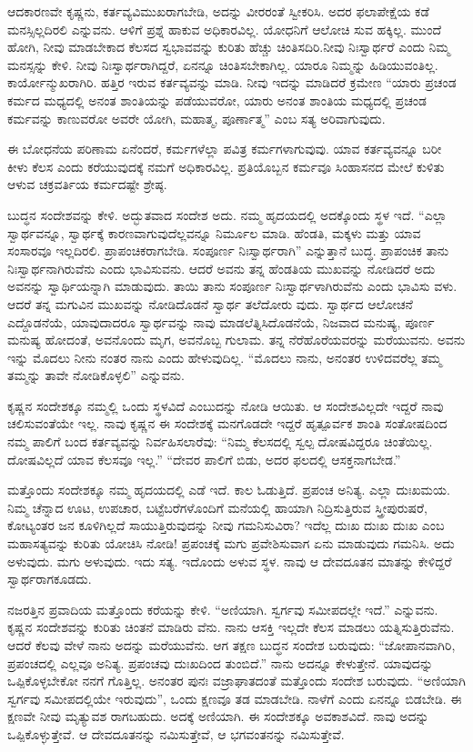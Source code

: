 ಆದಕಾರಣವೇ ಕೃಷ್ಣನು, ಕರ್ತವ್ಯವಿಮುಖರಾಗಬೇಡಿ, ಅದನ್ನು ವೀರರಂತೆ ಸ್ವೀಕರಿಸಿ. ಅದರ ಫಲಾಪೇಕ್ಷೆಯ ಕಡೆ ಮನಸ್ಸಿಲ್ಲದಿರಲಿ ಎನ್ನುವನು. ಆಳಿಗೆ ಪ್ರಶ್ನೆ ಹಾಕುವ ಅಧಿಕಾರವಿಲ್ಲ. ಯೋಧನಿಗೆ ಆಲೋಚಿ ಸುವ ಹಕ್ಕಿಲ್ಲ. ಮುಂದೆ ಹೋಗಿ, ನೀವು ಮಾಡಬೇಕಾದ ಕೆಲಸದ ಸ್ವಭಾವವನ್ನು ಕುರಿತು ಹೆಚ್ಚು ಚಿಂತಿಸದಿರಿ.ನೀವು ನಿಃಸ್ವಾರ್ಥರೆ ಎಂದು ನಿಮ್ಮ ಮನಸ್ಸನ್ನು ಕೇಳಿ. ನೀವು ನಿಃಸ್ವಾರ್ಥರಾಗಿದ್ದರೆ, ಏನನ್ನೂ ಚಿಂತಿಸಬೇಕಾಗಿಲ್ಲ. ಯಾರೂ ನಿಮ್ಮನ್ನು ಹಿಡಿಯುವಂತಿಲ್ಲ. ಕಾರ್ಯೋನ್ಮುಖರಾಗಿರಿ. ಹತ್ತಿರ ಇರುವ ಕರ್ತವ್ಯವನ್ನು ಮಾಡಿ. ನೀವು ಇದನ್ನು ಮಾಡಿದರೆ ಕ್ರಮೇಣ “ಯಾರು ಪ್ರಚಂಡ ಕರ್ಮದ ಮಧ್ಯದಲ್ಲಿ ಅನಂತ ಶಾಂತಿಯನ್ನು ಪಡೆಯುವರೋ, ಯಾರು ಅನಂತ ಶಾಂತಿಯ ಮಧ್ಯದಲ್ಲಿ ಪ್ರಚಂಡ ಕರ್ಮವನ್ನು ಕಾಣುವರೋ ಅವರೇ ಯೋಗಿ, ಮಹಾತ್ಮ, ಪೂರ್ಣಾತ್ಮ” ಎಂಬ ಸತ್ಯ ಅರಿವಾಗುವುದು.

ಈ ಬೋಧನೆಯ ಪರಿಣಾಮ ಏನೆಂದರೆ, ಕರ್ಮಗಳೆಲ್ಲಾ ಪವಿತ್ರ ಕರ್ಮಗಳಾಗುವುವು. ಯಾವ ಕರ್ತವ್ಯವನ್ನೂ ಬರೀ ಕೀಳು ಕೆಲಸ ಎಂದು ಕರೆಯುವುದಕ್ಕೆ ನಮಗೆ ಅಧಿಕಾರವಿಲ್ಲ. ಪ್ರತಿಯೊಬ್ಬನ ಕರ್ಮವೂ ಸಿಂಹಾಸನದ ಮೇಲೆ ಕುಳಿತು ಆಳುವ ಚಕ್ರವರ್ತಿಯ ಕರ್ಮದಷ್ಟೇ ಶ್ರೇಷ್ಠ.

ಬುದ್ಧನ ಸಂದೇಶವನ್ನು ಕೇಳಿ. ಅದ್ಭುತವಾದ ಸಂದೇಶ ಅದು. ನಮ್ಮ ಹೃದಯದಲ್ಲಿ ಅದಕ್ಕೊಂದು ಸ್ಥಳ ಇದೆ. “ಎಲ್ಲಾ ಸ್ವಾರ್ಥವನ್ನೂ, ಸ್ವಾರ್ಥಕ್ಕೆ ಕಾರಣವಾಗುವುದೆಲ್ಲವನ್ನೂ ನಿರ್ಮೂಲ ಮಾಡಿ. ಹೆಂಡತಿ, ಮಕ್ಕಳು ಮತ್ತು ಯಾವ ಸಂಸಾರವೂ ಇಲ್ಲದಿರಲಿ. ಪ್ರಾಪಂಚಿಕರಾಗಬೇಡಿ. ಸಂಪೂರ್ಣ ನಿಃಸ್ವಾರ್ಥರಾಗಿ” ಎನ್ನುತ್ತಾನೆ ಬುದ್ಧ. ಪ್ರಾಪಂಚಿಕ ತಾನು ನಿಃಸ್ವಾರ್ಥನಾಗಿರುವೆನು ಎಂದು ಭಾವಿಸುವನು. ಆದರೆ ಅವನು ತನ್ನ ಹೆಂಡತಿಯ ಮುಖವನ್ನು ನೋಡಿದರೆ ಅದು ಅವನನ್ನು ಸ್ವಾರ್ಥಿಯನ್ನಾಗಿ ಮಾಡುವುದು. ತಾಯಿ ತಾನು ಸಂಪೂರ್ಣ ನಿಃಸ್ವಾರ್ಥಳಾಗಿರುವೆನು ಎಂದು ಭಾವಿಸು ವಳು. ಆದರೆ ತನ್ನ ಮಗುವಿನ ಮುಖವನ್ನು ನೋಡಿದೊಡನೆ ಸ್ವಾರ್ಥ ತಲೆದೋರು ವುದು. ಸ್ವಾರ್ಥದ ಆಲೋಚನೆ ಎದ್ದೊಡನೆಯೆ, ಯಾವುದಾದರೂ ಸ್ವಾರ್ಥವನ್ನು ನಾವು ಮಾಡಲೆತ್ನಿಸಿದೊಡನೆಯೆ, ನಿಜವಾದ ಮನುಷ್ಯ, ಪೂರ್ಣ ಮನುಷ್ಯ ಹೋದಂತೆ, ಅವನೊಂದು ಮೃಗ, ಅವನೊಬ್ಬ ಗುಲಾಮ. ತನ್ನ ನೆರೆಹೊರೆಯವರನ್ನು ಮರೆಯುವನು. ಅವನು ಇನ್ನು ಮೊದಲು ನೀನು ನಂತರ ನಾನು ಎಂದು ಹೇಳುವುದಿಲ್ಲ. “ಮೊದಲು ನಾನು, ಅನಂತರ ಉಳಿದವರೆಲ್ಲ ತಮ್ಮ ತಮ್ಮನ್ನು ತಾವೇ ನೋಡಿಕೊಳ್ಳಲಿ” ಎನ್ನುವನು.

ಕೃಷ್ಣನ ಸಂದೇಶಕ್ಕೂ ನಮ್ಮಲ್ಲಿ ಒಂದು ಸ್ಥಳವಿದೆ ಎಂಬುದನ್ನು ನೋಡಿ ಆಯಿತು. ಆ ಸಂದೇಶವಿಲ್ಲದೇ ಇದ್ದರೆ ನಾವು ಚಲಿಸುವಂತೆಯೇ ಇಲ್ಲ. ನಾವು ಕೃಷ್ಣನ ಈ ಸಂದೇಶಕ್ಕೆ ಮನಗೊಡದೇ ಇದ್ದರೆ ಹೃತ್ಪೂರ್ವಕ ಶಾಂತಿ ಸಂತೋಷದಿಂದ ನಮ್ಮ ಪಾಲಿಗೆ ಬಂದ ಕರ್ತವ್ಯವನ್ನು ನಿರ್ವಹಿಸಲಾರೆವು: “ನಿಮ್ಮ ಕೆಲಸದಲ್ಲಿ ಸ್ವಲ್ಪ ದೋಷವಿದ್ದರೂ ಚಿಂತೆಯಿಲ್ಲ. ದೋಷವಿಲ್ಲದೆ ಯಾವ ಕೆಲಸವೂ ಇಲ್ಲ.” “ದೇವರ ಪಾಲಿಗೆ ಬಿಡು, ಅದರ ಫಲದಲ್ಲಿ ಆಸಕ್ತನಾಗಬೇಡ.”

ಮತ್ತೊಂದು ಸಂದೇಶಕ್ಕೂ ನಮ್ಮ ಹೃದಯದಲ್ಲಿ ಎಡೆ ಇದೆ. ಕಾಲ ಓಡುತ್ತಿದೆ. ಪ್ರಪಂಚ ಅನಿತ್ಯ. ಎಲ್ಲಾ ದುಃಖಮಯ. ನಿಮ್ಮ ಚೆನ್ನಾದ ಊಟ, ಉಪಚಾರ, ಬಟ್ಟೆಬರೆಗಳೊಂದಿಗೆ ಮನೆಯಲ್ಲಿ ಹಾಯಾಗಿ ನಿದ್ರಿಸುತ್ತಿರುವ ಸ್ತ್ರೀಪುರುಷರೆ, ಕೋಟ್ಯಂತರ ಜನ ಕೂಳಿಗಿಲ್ಲದೆ ಸಾಯುತ್ತಿರುವುದನ್ನು ನೀವು ಗಮನಿಸುವಿರಾ? ಇದೆಲ್ಲ ದುಃಖ ದುಃಖ ದುಃಖ ಎಂಬ ಮಹಾಸತ್ಯವನ್ನು ಕುರಿತು ಯೋಚಿಸಿ ನೋಡಿ! ಪ್ರಪಂಚಕ್ಕೆ ಮಗು ಪ್ರವೇಶಿಸುವಾಗ ಏನು ಮಾಡುವುದು ಗಮನಿಸಿ. ಅದು ಅಳುವುದು. ಮಗು ಅಳುವುದು. ಇದು ಸತ್ಯ. ಇದೊಂದು ಅಳುವ ಸ್ಥಳ. ನಾವು ಆ ದೇವದೂತನ ಮಾತನ್ನು ಕೇಳಿದ್ದರೆ ಸ್ವಾರ್ಥರಾಗಕೂಡದು.

ನಜರತ್ತಿನ ಪ್ರವಾದಿಯ ಮತ್ತೊಂದು ಕರೆಯನ್ನು ಕೇಳಿ. “ಅಣಿಯಾಗಿ. ಸ್ವರ್ಗವು ಸಮೀಪದಲ್ಲೇ ಇದೆ.” ಎನ್ನುವನು. ಕೃಷ್ಣನ ಸಂದೇಶವನ್ನು ಕುರಿತು ಚಿಂತನೆ ಮಾಡಿರು ವೆನು. ನಾನು ಆಸಕ್ತಿ ಇಲ್ಲದೇ ಕೆಲಸ ಮಾಡಲು ಯತ್ನಿಸುತ್ತಿರುವೆನು. ಆದರೆ ಕೆಲವು ವೇಳೆ ನಾನು ಅದನ್ನು ಮರೆಯುವೆನು. ಆಗ ತಕ್ಷಣ ಬುದ್ಧನ ಸಂದೇಶ ಬರುವುದು: “ಜೋಪಾನವಾಗಿರಿ, ಪ್ರಪಂಚದಲ್ಲಿ ಎಲ್ಲವೂ ಅನಿತ್ಯ. ಪ್ರಪಂಚವು ದುಃಖದಿಂದ ತುಂಬಿದೆ.” ನಾನು ಅದನ್ನೂ ಕೇಳುತ್ತೇನೆ. ಯಾವುದನ್ನು ಒಪ್ಪಿಕೊಳ್ಳಬೇಕೋ ನನಗೆ ಗೊತ್ತಿಲ್ಲ. ಅನಂತರ ಪುನಃ ವಜ್ರಾಘಾತದಂತೆ ಮತ್ತೊಂದು ಸಂದೇಶ ಬರುವುದು. “ಅಣಿಯಾಗಿ ಸ್ವರ್ಗವು ಸಮೀಪದಲ್ಲಿಯೇ ಇರುವುದು”, ಒಂದು ಕ್ಷಣವೂ ತಡ ಮಾಡಬೇಡಿ. ನಾಳೆಗೆ ಎಂದು ಏನನ್ನೂ ಬಿಡಬೇಡಿ. ಈ ಕ್ಷಣವೇ ನೀವು ಮೃತ್ಯುವಶ ರಾಗಬಹುದು. ಅದಕ್ಕೆ ಅಣಿಯಾಗಿ. ಈ ಸಂದೇಶಕ್ಕೂ ಅವಕಾಶವಿದೆ. ನಾವು ಅದನ್ನು ಒಪ್ಪಿಕೊಳ್ಳುತ್ತೇವೆ. ಆ ದೇವದೂತನನ್ನು ನಮಿಸುತ್ತೇವೆ, ಆ ಭಗವಂತನನ್ನು ನಮಿಸುತ್ತೇವೆ.

